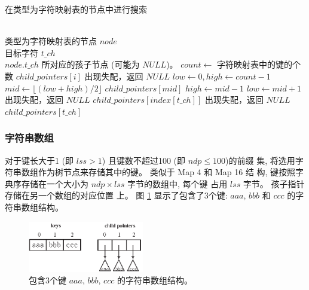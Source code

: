 \begin{algorithm}
  \caption{在类型为字符映射表的节点中进行搜索}\scriptsize
  \label{alg:character map}
  \begin{algorithmic}[1]
    \REQUIRE ~~\\
    类型为字符映射表的节点 $node$\\
    目标字符 $t\_ch$
    \ENSURE ~~\\
     $node.t\_ch$ 所对应的孩子节点 (可能为 $NULL$)。
    \STATE
    \STATE $count \leftarrow$ 字符映射表中的键的个数
    \STATE
    \RETURN $child\_pointers[i]$
    \ENDIF
    \ENDFOR
    \STATE 出现失配，返回 $NULL$
    \ENDCASE
    \STATE
    \STATE $low \leftarrow 0, high \leftarrow count-1$
    \STATE $mid \leftarrow \lfloor (low+high)/2 \rfloor$
    \RETURN $child\_pointers[mid]$
    \STATE $high \leftarrow mid-1$
    \ELSE
    \STATE $low \leftarrow mid+1$
    \ENDIF
    \ENDWHILE
    \STATE 出现失配，返回 $NULL$
    \ENDCASE
    \STATE
    \RETURN $child\_pointers[index[t\_ch]]$
    \ELSE
    \STATE 出现失配，返回 $NULL$
    \ENDIF
    \ENDCASE
    \STATE
    \RETURN $child\_pointers[t\_ch]$
    \ENDCASE
    \ENDPWITCH
  \end{algorithmic}
\end{algorithm}

\subsubsection{字符串数组}
\label{sec:string array}

对于键长大于1 (即 $lss > 1$) 且键数不超过100 (即 $ndp \leq 100$)的前缀
集, 将选用字符串数组作为树节点来存储其中的键。 类似于 Map 4 和 Map 16 结
构, 键按照字典序存储在一个大小为 $ndp \times lss$ 字节的数组中, 每个键
占用 $lss$ 字节。 孩子指针存储在另一个数组的对应位置
上。 图 \ref{fig:string array} 显示了包含了3个键: $aaa$, $bbb$ 和 $ccc$
的字符串数组结构。

\begin{figure}[!h]
  \centering
  \includegraphics[width=0.45\textwidth]{figures/2_MPM/string_array}
  \caption{包含3个键 $aaa,\, bbb,\, ccc$ 的字符串数组结构。}
  \label{fig:string array}
\end{figure}

